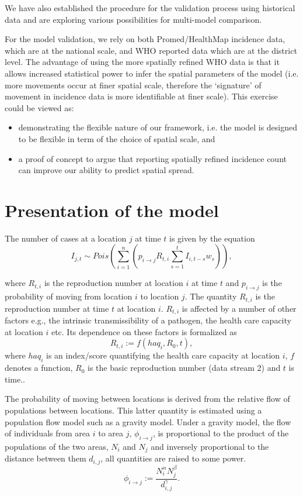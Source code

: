 \documentclass[11pt,]{article}
\begin{document}
We have also established the procedure for the validation process
using historical data and are exploring various possibilities for multi-model comparison. 

For the model validation, we rely on both Promed/HealthMap incidence data, which are 
at the national scale, and WHO reported data which are at the district level. The advantage 
of using the more spatially refined WHO data is that it allows increased statistical power to 
infer the spatial parameters of the model (i.e. more movements occur at finer spatial scale, 
therefore the `signature' of movement in incidence data is more identifiable at finer scale).
This exercise could be viewed as:
\begin{itemize}
\item demonstrating the flexible nature of our framework, i.e. 
the model is designed to be flexible in term of the choice of spatial scale, and
\item a proof of concept to argue that reporting spatially refined incidence count can improve our ability to
predict spatial spread.
\end{itemize}

\section{Presentation of the model}\label{sec:model}

The number of cases at a location \(j\) at time \(t\) is given by the equation
\[
  I_{j, t} \sim Pois\left( \sum_{i = 1}^{n} {\left( p_{i \rightarrow j}
  R_{t, i} \sum_{s = 1}^{t}{I_{i, t - s} w_{s}}\right)} \right),
\]

where \(R_{t, i}\) is the reproduction number at location \(i\) at time
\(t\) and \(p_{i \rightarrow j}\) is the probability of moving from
location \(i\) to location \(j\). The quantity $R_{t, i}$ is the
reproduction number at time $t$ at location $i$. $R_{t, i}$ is
affected by a number of other factors e.g., the intrinsic
transmissibility of a pathogen, the health care capacity at location
$i$ etc. Its dependence on these factors is formalized as
\[ R_{t, i} := f(haq_i, R_0, t),\]
where $haq_i$ is an index/score quantifying the health care capacity at location 
$i$, $f$ denotes a function, $R_0$ is the basic reproduction number (data stream 2) and $t$ is time..

The probability of moving between locations is derived from the relative flow of populations between
locations. This latter quantity is estimated using a population flow
model such as a gravity model. Under a gravity model, the flow of individuals from area \(i\) to area \(j\),
\(\phi_{i \rightarrow j}\), is proportional to the product of the
populations of the two areas, \(N_i\) and \(N_j\) and inversely
proportional to the distance between them \(d_{i, j}\), all quantities
are raised to some power.
\[
  \phi_{i \rightarrow j} :=  \frac{N_i^{\alpha}N_j^{\beta}}{d_{i, j}^{\gamma}}.
\]
\end{document}
